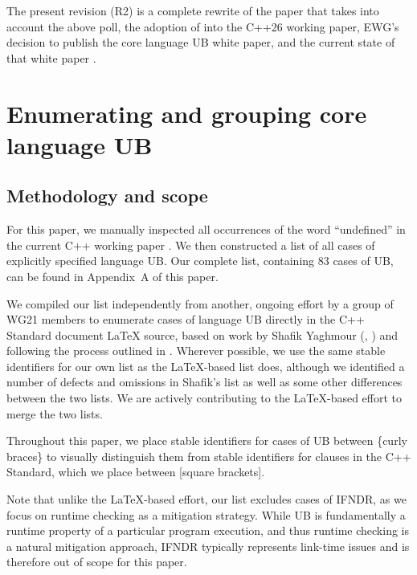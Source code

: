 The present revision (R2) is a complete rewrite of the paper that takes into account the above poll, the adoption of \cite{P2900R14} into the C++26 working paper, EWG's decision to publish the core language UB white paper, and the current state of that white paper \cite{P3656R1}.

\section{Enumerating and grouping core language UB}
\label{ub}

\subsection{Methodology and scope}

For this paper, we manually inspected all occurrences of the word ``undefined'' in the current C++ working paper \cite{N5008}. We then constructed a list of all cases of explicitly specified language UB. Our complete list, containing 83 cases of UB, can be found in Appendix~A of this paper. %

We compiled our list independently from another, ongoing effort by a group of WG21 members to enumerate cases of language UB directly in the C++ Standard document  \LaTeX{} source, based on work by Shafik Yaghmour (\cite{P1705R1}, \cite{P3075R0}) and following the process outlined in \cite{P3656R1}. Wherever possible, we use the same stable identifiers for our own list as the \LaTeX-based list does, although we identified a number of defects and omissions in Shafik's list as well as some other differences between the two lists. We are actively contributing to the \LaTeX-based effort to merge the two lists. 

Throughout this paper, we place stable identifiers for cases of UB between \{curly braces\} to visually distinguish them from stable identifiers for clauses in the C++ Standard, which we place between [square brackets].

Note that unlike the \LaTeX-based effort, our list excludes cases of IFNDR, as we focus on runtime checking as a mitigation strategy. While UB is fundamentally a runtime property of a particular program execution, and thus runtime checking is a natural mitigation approach, IFNDR typically represents link-time issues and is therefore out of scope for this paper.

